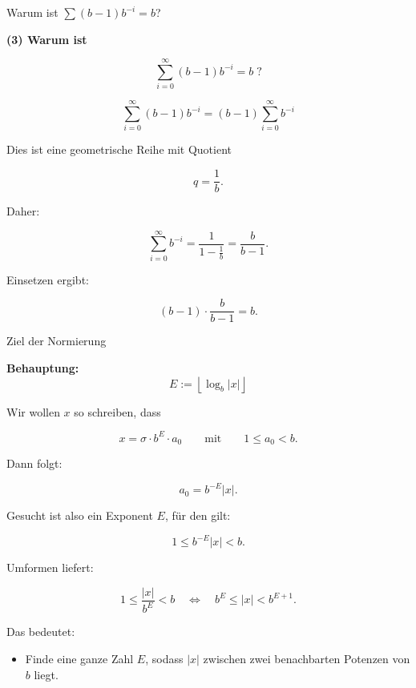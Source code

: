 \documentclass{beamer}
\begin{document}
\begin{frame}{Warum ist \(\sum (b-1)b^{-i}=b\)?}

\scriptsize

\textbf{(3) Warum ist}

\[
\sum_{i=0}^{\infty}(b-1)b^{-i}=b\; ?
\]

\vspace{0.4cm}

\[
\sum_{i=0}^{\infty}(b-1)b^{-i}
=
(b-1)\sum_{i=0}^{\infty} b^{-i}
\]

\vspace{0.3cm}

Dies ist eine geometrische Reihe mit Quotient

\[
q=\frac{1}{b}.
\]

Daher:

\[
\sum_{i=0}^{\infty} b^{-i}
=
\frac{1}{1-\frac{1}{b}}
=
\frac{b}{b-1}.
\]

\vspace{0.3cm}

Einsetzen ergibt:

\[
(b-1)\cdot \frac{b}{b-1}=b.
\]

\end{frame}

\begin{frame}{Ziel der Normierung}

\textbf{Behauptung:}
\[
E := \left\lfloor \log_b |x| \right\rfloor
\]

\vspace{0.4cm}

Wir wollen \(x\) so schreiben, dass

\[
x=\sigma \cdot b^E \cdot a_0
\qquad \text{mit} \qquad 1 \leq a_0 < b.
\]

Dann folgt:

\[
a_0=b^{-E}|x|.
\]

\vspace{0.4cm}

Gesucht ist also ein Exponent \(E\), für den gilt:

\[
1 \leq b^{-E}|x| < b.
\]

Umformen liefert:

\[
1 \leq \frac{|x|}{b^E} < b
\quad \Longleftrightarrow \quad
b^E \leq |x| < b^{E+1}.
\]

\vspace{0.4cm}

Das bedeutet:

\begin{itemize}
    \item Finde eine ganze Zahl \(E\), sodass \(|x|\)
    zwischen zwei benachbarten Potenzen von \(b\) liegt.
\end{itemize}

\end{frame}
\end{document}
